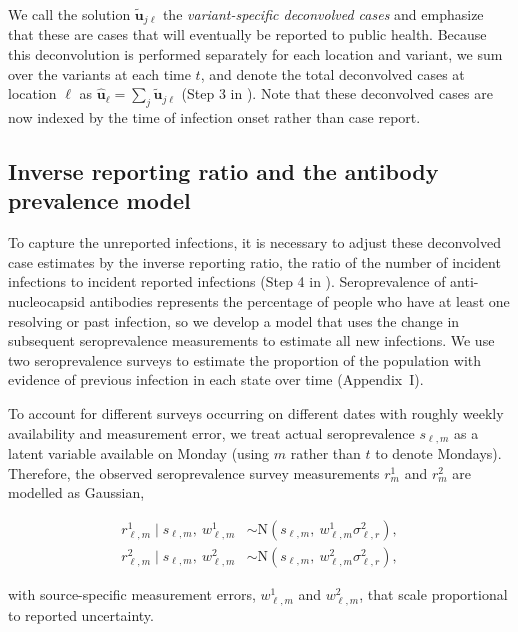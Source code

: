 We call the solution $\widetilde{\mathbf{u}}_{j\ell}$ the \emph{variant-specific
deconvolved cases} and emphasize that these are cases that will eventually be
reported to public health. Because this deconvolution is performed separately
for each location and variant, we sum over the variants at each time $t$, and
denote the total deconvolved cases at location $\ell$ as
$\widehat{\mathbf{u}}_\ell = \sum_j \widetilde{\mathbf{u}}_{j\ell}$ (Step 3 in
). Note that these deconvolved cases are now
indexed by the time of infection onset rather than case report.




\subsection{Inverse reporting ratio and the antibody prevalence model} 
\label{sec:report-ratio}

To capture the unreported infections, it is necessary to adjust these
deconvolved case estimates by the inverse reporting ratio, the ratio of the
number of incident infections to incident reported infections (Step 4 in
). Seroprevalence of anti-nucleocapsid
antibodies represents the percentage of people who have at least one resolving
or past infection, \citep{cdc2020data} so we develop a model that uses the
change in subsequent seroprevalence measurements to estimate all new infections. 
We use two seroprevalence surveys to estimate the proportion of the
population with evidence of previous infection in each state over time  %
(Appendix~I). \citep{cdc2021blood, cdc2021comm}

To account
for different surveys occurring on different dates with roughly weekly
availability and measurement error, we treat actual seroprevalence $s_{\ell,m}$
as a latent variable available on Monday (using $m$ rather than $t$ to denote
Mondays). Therefore, the observed seroprevalence survey measurements $r^1_m$ and
$r^2_m$ are modelled as Gaussian,
\begin{linenomath*}
\begin{align}
\label{eq:sero-measurements}
r^1_{\ell,m} \mid s_{\ell,m},\ w^1_{\ell,m} &\sim \textrm{N}(s_{\ell,m},\ w^1_{\ell,m}\sigma^2_{\ell,r}),\\
r^2_{\ell,m} \mid s_{\ell,m},\  w^2_{\ell,m}
  &\sim \textrm{N}(s_{\ell,m},\ w^2_{\ell,m}\sigma^2_{\ell,r}),
\end{align}
\end{linenomath*}
with source-specific measurement errors, $w^1_{\ell,m}$ and $w^2_{\ell,m}$, that
scale proportional to reported uncertainty.

